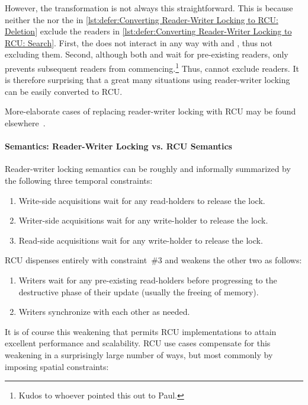 However, the transformation is not always this straightforward.
This is because neither the  nor the
 in
\cref{lst:defer:Converting Reader-Writer Locking to RCU: Deletion}
exclude the readers in
\cref{lst:defer:Converting Reader-Writer Locking to RCU: Search}.
First, the  does not interact in any way with
 and , thus not excluding them.
Second, although both  and 
wait for pre-existing readers, only  prevents
subsequent readers from commencing.\footnote{
	Kudos to whoever pointed this out to Paul.}
Thus,  cannot exclude readers.
It is therefore surprising that a great many situations
using reader-writer locking can be easily converted to RCU\@.

More-elaborate cases of replacing reader-writer locking with RCU
may be found
elsewhere~\cite{NeilBrown2015PathnameLookup,NeilBrown2015RCUwalk}.

\paragraph{Semantics: Reader-Writer Locking vs. RCU Semantics}

Reader-writer locking semantics can be roughly and informally summarized
by the following three temporal constraints:

\begin{enumerate}
\item	Write-side acquisitions wait for any read-holders to release
	the lock.
\item	Writer-side acquisitions wait for any write-holder to release
	the lock.
\item	Read-side acquisitions wait for any write-holder to release
	the lock.
\end{enumerate}

RCU dispenses entirely with constraint~\#3 and weakens the other two
as follows:

\begin{enumerate}
\item	Writers wait for any pre-existing read-holders before progressing
	to the destructive phase of their update (usually the freeing of
	memory).
\item	Writers synchronize with each other as needed.
\end{enumerate}

It is of course this weakening that permits RCU implementations to attain
excellent performance and scalability.
RCU use cases compensate for this weakening in a surprisingly large number
of ways, but most commonly by imposing spatial constraints:

